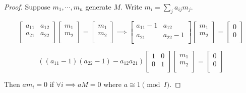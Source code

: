 \documentclass{article}
\theoremstyle{definition}
\begin{document}
    \begin{proof}
        Suppose \(m_1 , \cdots , m_n\) generate \(M\). Write \(m_i = \sum_{j} a_{ij} m_j\).
        
        \[
            \begin{bmatrix}
                a_{11} & a_{12} \\
                a_{21}  & a_{22}  \\
            \end{bmatrix} \begin{bmatrix}
                m_1 \\
                m_2 \\
            \end{bmatrix} = \begin{bmatrix}
                m_1 \\
                m_2 \\
            \end{bmatrix} \implies \begin{bmatrix}
                a_{11} -1  & a_{12}  \\
                a_{21}  & a_{22} -1 \\
            \end{bmatrix} \begin{bmatrix}
                m_1 \\
                m_2 \\
            \end{bmatrix} = \begin{bmatrix}
                0 \\
                0 \\
            \end{bmatrix} 
        \]

        \[
            ((a_{11} - 1)(a_{22} - 1) - a_{12}a_{21}) \begin{bmatrix}
                1 & 0 \\
                0 & 1 \\
            \end{bmatrix} \begin{bmatrix}
                m_1 \\
                m_2 \\
            \end{bmatrix} = \begin{bmatrix}
                0 \\
                0 \\
            \end{bmatrix} 
        \]
        
        Then \(am_i = 0\) if \(\forall i \implies a M = 0\) where \(a \cong 1 \pmod I\).

    \end{proof}
\end{document}
